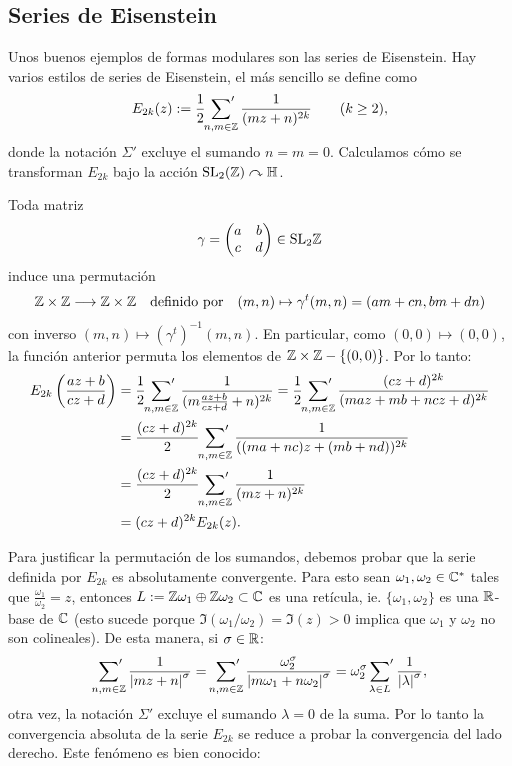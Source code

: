 \subsection{Series de Eisenstein}\label{sec:eisenstein}%

Unos buenos ejemplos de formas modulares son las series de Eisenstein. Hay varios
estilos de series de Eisenstein, el m\'as sencillo se define como
\[
  E_{2k}(z):=\frac{1}{2}\sideset{}{'}\sum_{n,m\in\mathbb{Z}}\frac{1}{(mz+n)^{2k}} \qquad (k\geq 2),
\]
donde la notaci\'on $\Sigma'$ excluye el sumando $n=m=0$. Calculamos c\'omo se
transforman $E_{2k}$ bajo la acci\'on $\mathrm{SL}_2(\mathbb{Z})\curvearrowright\mathbb{H}$.

Toda matriz
\[
  \gamma=
  \begin{pmatrix}
    a & b\\ c&d
  \end{pmatrix} \in \mathrm{SL}_2\mathbb{Z}
\]
induce una permutaci\'on
\[
  \mathbb{Z}\times\mathbb{Z} \longrightarrow \mathbb{Z}\times\mathbb{Z} \quad\text{definido por}\quad
  (m,n)\mapsto \gamma^t(m,n)=(am+cn,bm+dn)
\]
con inverso $(m,n)\mapsto (\gamma^t)^{-1}(m,n)$. En particular, como
$(0,0)\mapsto(0,0)$, la funci\'on anterior permuta los elementos de $\mathbb{Z}\times\mathbb{Z}-\{(0,0)\}$.
Por lo tanto:
\begin{align}
  E_{2k}\left( \frac{az+b}{cz+d} \right)&=
  \frac{1}{2}\sideset{}{'}\sum_{n,m\in\mathbb{Z}}\frac{1}{(m\frac{az+b}{cz+d}+n)^{2k}}=
  \frac{1}{2}\sideset{}{'}\sum_{n,m\in\mathbb{Z}}\frac{(cz+d)^{2k}}{(maz+mb+ncz+d)^{2k}}\nonumber\\ & =
  \frac{(cz+d)^{2k}}{2}\sideset{}{'}\sum_{n,m\in\mathbb{Z}}\frac{1}{((ma+nc)z+(mb+nd))^{2k}}\nonumber\\ &=
  \frac{(cz+d)^{2k}}{2}\sideset{}{'}\sum_{n,m\in\mathbb{Z}}\frac{1}{(mz+n)^{2k}}\nonumber\\ & =
  (cz+d)^{2k}E_{2k}(z) \label{eq:eisenstein2k}.              
\end{align}

Para justificar la permutaci\'on de los sumandos, debemos probar que la serie definida por
$E_{2k}$ es absolutamente convergente. Para esto sean $\omega_1,\omega_2\in\mathbb{C}^*$ tales que
$\tfrac{\omega_1}{\omega_2}=z$, entonces $L:=\mathbb{Z}\omega_1\oplus\mathbb{Z}\omega_2\subset\mathbb{C}$ es una
ret\'icula, ie. $\{\omega_1,\omega_2\}$ es una $\mathbb{R}$-base de $\mathbb{C}$ (esto sucede porque
$\Im(\omega_1/\omega_2)=\Im(z)>0$ implica que $\omega_1$ y $\omega_2$ no son colineales).
De esta manera, si $\sigma\in\mathbb{R}$:
\[
  \sideset{}{'}\sum_{n,m\in\mathbb{Z}}\frac{1}{\left| mz+n \right|^{\sigma}}=
  \sideset{}{'}\sum_{n,m\in\mathbb{Z}}\frac{\omega_2^{\sigma}}{\left| m\omega_1+n\omega_2 \right|^{\sigma}}=
  \omega_2^{\sigma}\sideset{}{'}\sum_{\lambda\in L}\frac{1}{\left| \lambda \right|^{\sigma}},
\]
otra vez, la notaci\'on $\Sigma'$ excluye el sumando $\lambda=0$ de la suma. Por lo tanto la
convergencia absoluta de la serie $E_{2k}$ se reduce a probar la convergencia del lado derecho.
Este fen\'omeno es bien conocido:

